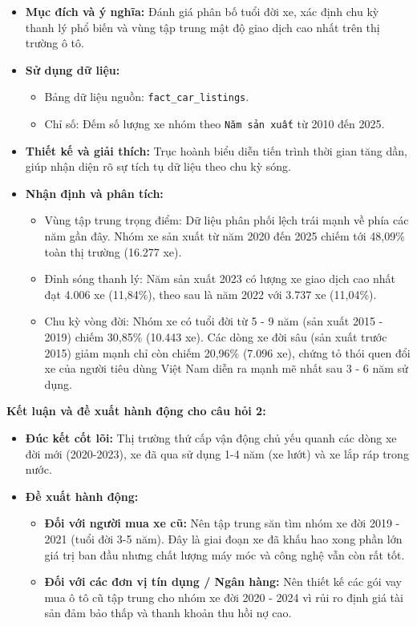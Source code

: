 \begin{itemize}
    \item \textbf{Mục đích và ý nghĩa:} Đánh giá phân bố tuổi đời xe, xác định chu kỳ thanh lý phổ biến và vùng tập trung mật độ giao dịch cao nhất trên thị trường ô tô.
    
    \item \textbf{Sử dụng dữ liệu:}
    \begin{itemize}
        \item Bảng dữ liệu nguồn: \texttt{fact\_car\_listings}.
        \item Chỉ số: Đếm số lượng xe nhóm theo \texttt{Năm sản xuất} từ 2010 đến 2025.
    \end{itemize}
    
    \item \textbf{Thiết kế và giải thích:} Trục hoành biểu diễn tiến trình thời gian tăng dần, giúp nhận diện rõ sự tích tụ dữ liệu theo chu kỳ sóng.
    
    \item \textbf{Nhận định và phân tích:}
    \begin{itemize}
        \item Vùng tập trung trọng điểm: Dữ liệu phân phối lệch trái mạnh về phía các năm gần đây. Nhóm xe sản xuất từ năm 2020 đến 2025 chiếm tới 48,09\% toàn thị trường (16.277 xe).
        \item Đỉnh sóng thanh lý: Năm sản xuất 2023 có lượng xe giao dịch cao nhất đạt 4.006 xe (11,84\%), theo sau là năm 2022 với 3.737 xe (11,04\%).
        \item Chu kỳ vòng đời: Nhóm xe có tuổi đời từ 5 - 9 năm (sản xuất 2015 - 2019) chiếm 30,85\% (10.443 xe). Các dòng xe đời sâu (sản xuất trước 2015) giảm mạnh chỉ còn chiếm 20,96\% (7.096 xe), chứng tỏ thói quen đổi xe của người tiêu dùng Việt Nam diễn ra mạnh mẽ nhất sau 3 - 6 năm sử dụng.
    \end{itemize}
\end{itemize}

\noindent\textbf{Kết luận và đề xuất hành động cho câu hỏi 2:} 
\begin{itemize}
    \item \textbf{Đúc kết cốt lõi:} Thị trường thứ cấp vận động chủ yếu quanh các dòng xe đời mới (2020-2023), xe đã qua sử dụng 1-4 năm (xe lướt) và xe lắp ráp trong nước.
    \item \textbf{Đề xuất hành động:} 
    \begin{itemize}
        \item \textbf{Đối với người mua xe cũ:} Nên tập trung săn tìm nhóm xe đời 2019 - 2021 (tuổi đời 3-5 năm). Đây là giai đoạn xe đã khấu hao xong phần lớn giá trị ban đầu nhưng chất lượng máy móc và công nghệ vẫn còn rất tốt.
        \item \textbf{Đối với các đơn vị tín dụng / Ngân hàng:} Nên thiết kế các gói vay mua ô tô cũ tập trung cho nhóm xe đời 2020 - 2024 vì rủi ro định giá tài sản đảm bảo thấp và thanh khoản thu hồi nợ cao.
    \end{itemize}
\end{itemize}


